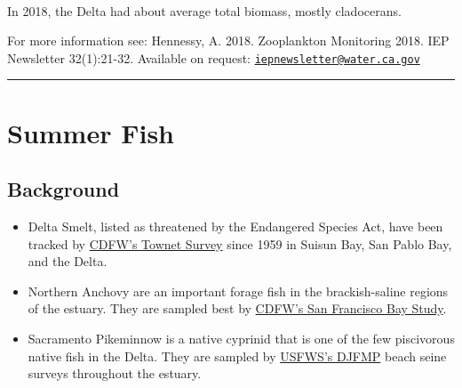 \documentclass[
]{book}
\providecommand{\tightlist}{%
  \setlength{\itemsep}{0pt}\setlength{\parskip}{0pt}}
\begin{document}
\begin{panel-grid}
\begin{columns-nocenter}
\begin{column800}
\end{column800}

\begin{column40}

~

\end{column40}

\begin{column800}

In 2018, the Delta had about average total biomass, mostly cladocerans.

\end{column800}

\end{columns-nocenter}

\end{panel-grid}

\begin{disclaimer}
For more information see: Hennessy, A. 2018. Zooplankton Monitoring
2018. IEP Newsletter 32(1):21-32. Available on request:
\href{mailto:iepnewsletter@water.ca.gov}{\nolinkurl{iepnewsletter@water.ca.gov}}
\end{disclaimer}

\begin{center}\rule{0.5\linewidth}{0.5pt}\end{center}

\hypertarget{summer-fish}{%
\section{Summer Fish}\label{summer-fish}}

\hypertarget{background-4}{%
\subsection{Background}\label{background-4}}

\begin{itemize}
\tightlist
\item
  Delta Smelt, listed as threatened by the Endangered Species Act, have been tracked by \href{https://wildlife.ca.gov/Conservation/Delta/Townet-Survey}{CDFW's Townet Survey} since 1959 in Suisun Bay, San Pablo Bay, and the Delta.
\item
  Northern Anchovy are an important forage fish in the brackish-saline regions of the estuary. They are sampled best by \href{https://wildlife.ca.gov/Conservation/Delta/Bay-Study}{CDFW's San Francisco Bay Study}.
\item
  Sacramento Pikeminnow is a native cyprinid that is one of the few piscivorous native fish in the Delta. They are sampled by \href{https://www.fws.gov/lodi/juvenile_fish_monitoring_program/jfmp_index.htm}{USFWS's DJFMP} beach seine surveys throughout the estuary.
\end{itemize}
\end{document}
